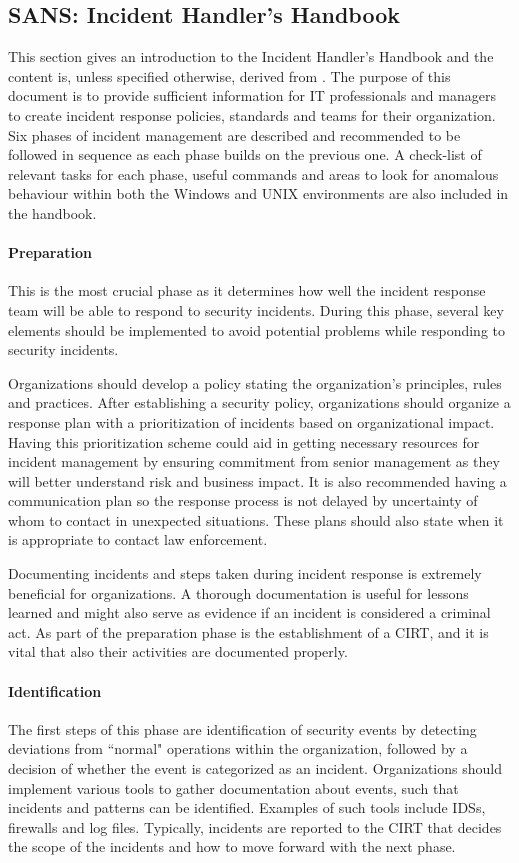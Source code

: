 \subsection{SANS: Incident Handler's Handbook}
This section gives an introduction to the Incident Handler's Handbook and the content is, unless specified otherwise, derived from \cite{SANShandbook}. The purpose of this document is to provide sufficient information for IT professionals and managers to create incident response policies, standards and teams for their organization. Six phases of incident management are described and recommended to be followed in sequence as each phase builds on the previous one. A check-list of relevant tasks for each phase, useful commands and areas to look for anomalous behaviour within both the Windows and UNIX environments are also included in the handbook.

\paragraph{Preparation} 
This is the most crucial phase as it determines how well the incident response team will be able to respond to security incidents. During this phase, several key elements should be implemented to avoid potential problems while responding to security incidents.

Organizations should develop a policy stating the organization's principles, rules and practices. After establishing a security policy, organizations should organize a response plan with a prioritization of incidents based on organizational impact. Having this prioritization scheme could aid in getting necessary resources for incident management by ensuring commitment from senior management as they will better understand risk and business impact. It is also recommended having a communication plan so the response process is not delayed by uncertainty of whom to contact in unexpected situations. These plans should also state when it is appropriate to contact law enforcement.

Documenting incidents and steps taken during incident response is extremely beneficial for organizations. A thorough documentation is useful for lessons learned and might also serve as evidence if an incident is considered a criminal act. As part of the preparation phase is the establishment of a \ac{CIRT}, and it is vital that also their activities are documented properly. 

\paragraph{Identification} 
The first steps of this phase are identification of security events by detecting deviations from ``normal" operations within the organization, followed by a decision of whether the event is categorized as an incident. Organizations should implement various tools to gather documentation about events, such that incidents and patterns can be identified. Examples of such tools include \acp{IDS}, firewalls and log files. Typically, incidents are reported to the \ac{CIRT} that decides the scope of the incidents and how to move forward with the next phase.

